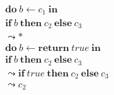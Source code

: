 \begin{equation}
\label{eq:ifCond}
    \begin{split}
        & \textbf{do} \  b \leftarrow c_1 \  \textbf{in} \\
        & \textbf{if} \  b \  \textbf{then} \  c_2 \  \textbf{else} \  c_3 \\
        & \leadsto * \\
        & \textbf{do} \  b \leftarrow \textbf{return} \  true \  \textbf{in} \\
        & \textbf{if} \  b \  \textbf{then} \  c_2 \  \textbf{else} \  c_3 \\
        & \leadsto \textbf{if} \  true \  \textbf{then} \  c_2 \  \textbf{else} \  c_3 \\
        & \leadsto c_2
\end{split}
\end{equation}


